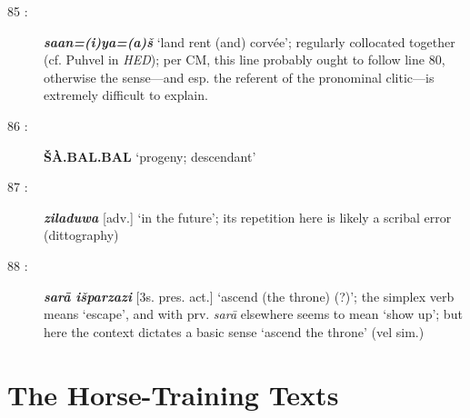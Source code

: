 \documentclass[10pt]{article}
\newcommand{\bit}[1]{\textbf{\textit{#1}}}				%
\newcommand{\p}[1]{{\tiny[{#1}]}}					%
\newcommand{\hith}{\textsubwedge{h}}
\renewcommand{\.}[1]{\textsubdot{#1}}
\begin{document}
\begin{description}
\item[85 :] \bit{sa{\hith\hith}an=(i)ya=(a)\v{s}} `land rent (and) corv\'ee'; regularly collocated together (cf. Puhvel in \textit{HED}); per CM, this line probably ought to follow line 80, otherwise the sense---and esp. the referent of the pronominal clitic---is extremely difficult to explain.

\item[86 :] \textbf{\v{S}\`A.BAL.BAL} `progeny; descendant'

\item[87 :] \bit{ziladuwa} \p{adv.} `in the future'; its repetition here is likely a scribal error (dittography)

\item[88 :] \bit{sar\=a i\v{s}parzazi} \p{3s. pres. act.} `ascend (the throne) (?)'; the simplex verb means `escape', and with prv. \textit{sar\=a} elsewhere seems to mean `show up'; but here the context dictates a basic sense `ascend the throne' (vel sim.)

\end{description}

\section{The Horse-Training Texts}
\end{document}
